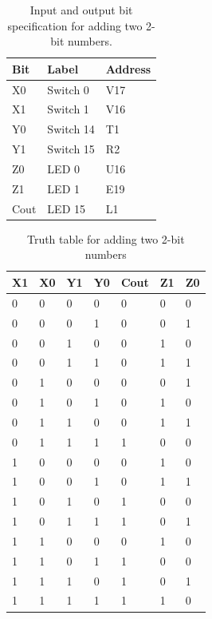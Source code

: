 \documentclass[11pt]{article}
\begin{document}
\begin{table}[h]
\begin{center}
	\begin{tabular}{| l | l | l |}
		\hline
		Bit & Label & Address \\ \hline
		X0 & Switch 0 & V17 \\ \hline
		X1 & Switch 1 & V16 \\ \hline
		Y0 & Switch 14 & T1 \\ \hline
		Y1 & Switch 15 & R2 \\ \hline
		Z0 & LED 0 & U16 \\ \hline
		Z1 & LED 1 & E19 \\ \hline
		Cout & LED 15 & L1 \\ \hline
	\end{tabular}
	\caption{\label{tab:table-name}Input and output bit specification for adding two 2-bit numbers.}
\end{center}	
\end{table}

\begin{table}[h]
\begin{center}
	\begin{tabular}{| l | l | l | l | l | l | l |}
		\hline
		X1 & X0 & Y1 & Y0 & Cout & Z1 & Z0 \\ \hline
		0 & 0 & 0 & 0 & 0 & 0 & 0 \\ \hline
		0 & 0 & 0 & 1 & 0 & 0 & 1 \\ \hline
		0 & 0 & 1 & 0 & 0 & 1 & 0 \\ \hline
		0 & 0 & 1 & 1 & 0 & 1 & 1 \\ \hline
		0 & 1 & 0 & 0 & 0 & 0 & 1 \\ \hline
		0 & 1 & 0 & 1 & 0 & 1 & 0 \\ \hline
		0 & 1 & 1 & 0 & 0 & 1 & 1 \\ \hline
		0 & 1 & 1 & 1 & 1 & 0 & 0 \\ \hline
		1 & 0 & 0 & 0 & 0 & 1 & 0 \\ \hline
		1 & 0 & 0 & 1 & 0 & 1 & 1 \\ \hline
		1 & 0 & 1 & 0 & 1 & 0 & 0 \\ \hline
		1 & 0 & 1 & 1 & 1 & 0 & 1 \\ \hline
		1 & 1 & 0 & 0 & 0 & 1 & 0 \\ \hline
		1 & 1 & 0 & 1 & 1 & 0 & 0 \\ \hline
		1 & 1 & 1 & 0 & 1 & 0 & 1 \\ \hline
		1 & 1 & 1 & 1 & 1 & 1 & 0 \\ \hline
	\end{tabular}
	\caption{\label{tab:table-name}Truth table for adding two 2-bit numbers}
\end{center}	
\end{table}
\end{document}

